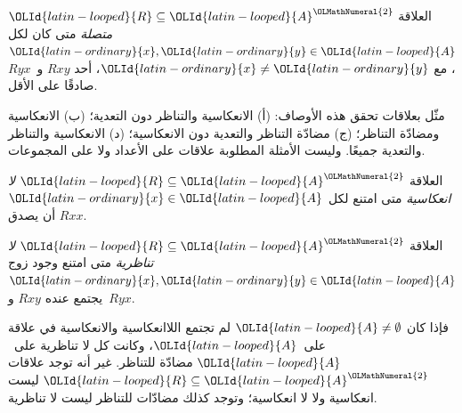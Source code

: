 \documentclass[../../../include/open-logic-section]{subfiles}
\begin{document}
\begin{defn}[الاتصالية]
العلاقة $\OLId{latin-looped}{R} \subseteq \OLId{latin-looped}{A}^\OLMathNumeral{2}$ \emph{متصلة} متى كان لكل $\OLId{latin-ordinary}{x},\OLId{latin-ordinary}{y}\in
\OLId{latin-looped}{A}$، مع $\OLId{latin-ordinary}{x} \neq \OLId{latin-ordinary}{y}$، أحد $Rxy$ و~$Ryx$ صادقًا على الأقل.
\end{defn}

\begin{prob}
مثّل بعلاقات تحقق هذه الأوصاف: (أ) الانعكاسية والتناظر دون التعدية؛
(ب) الانعكاسية ومضادّة التناظر؛ (ج) مضادّة التناظر والتعدية دون
الانعكاسية؛ (د) الانعكاسية والتناظر والتعدية جميعًا. وليست الأمثلة
المطلوبة علاقات على الأعداد ولا على المجموعات.
\end{prob}

\begin{defn}[اللاانعكاسية]
العلاقة $\OLId{latin-looped}{R} \subseteq \OLId{latin-looped}{A}^\OLMathNumeral{2}$ \emph{لا انعكاسية} متى امتنع لكل $\OLId{latin-ordinary}{x} \in
\OLId{latin-looped}{A}$ أن يصدق $Rxx$.
\end{defn}

\begin{defn}[اللاتناظرية]
العلاقة $\OLId{latin-looped}{R} \subseteq \OLId{latin-looped}{A}^\OLMathNumeral{2}$ \emph{لا تناظرية} متى امتنع وجود زوج
$\OLId{latin-ordinary}{x},\OLId{latin-ordinary}{y}\in \OLId{latin-looped}{A}$ يجتمع عنده $Rxy$ و~$Ryx$.
\end{defn}

فإذا كان $\OLId{latin-looped}{A} \neq \emptyset$ لم تجتمع اللاانعكاسية والانعكاسية في
علاقة على~$\OLId{latin-looped}{A}$، وكانت كل لا تناظرية على~$\OLId{latin-looped}{A}$ مضادّة للتناظر.
غير أنه توجد علاقات $\OLId{latin-looped}{R} \subseteq \OLId{latin-looped}{A}^\OLMathNumeral{2}$ ليست انعكاسية ولا لا انعكاسية؛
وتوجد كذلك مضادّات للتناظر ليست لا تناظرية.
\end{document}
